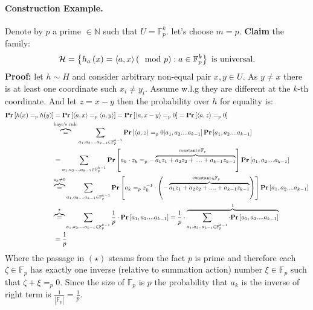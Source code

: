 \paragraph{Construction Example.}
Denote by \(p\) a prime \( \in \mathbb{N}\) such that \(U = \mathbb{F}_{p}^{k}\). let's choose \(m=p\).
\textbf{Claim} the family: \begin{equation*}
    \mathcal{H} = \left\{h_{a}\left(x\right) = \braket{a,x}\left(\mod p\right) : a \in \mathbb{F}_{p}^{k} \right\} \text{  is universal.}
\end{equation*} 
\textbf{Proof:} let \(h \sim H\) and consider arbitrary non-equal pair \(x,y\in U\). As \(y \neq x\) there is at least one coordinate such \(x_i \neq y_i\). Assume w.l.g they are different at the \(k\)-th coordinate. And let \(z = x- y\) then the probability over \(h\) for equality is:  \begin{equation*}
\begin{split}
    \mathbf{Pr} \left[ {h(x) =_{p} h(y)} \right] &= \mathbf{Pr} \left[ {\braket{a,x} =_{p} \braket{a,y}} \right] = \mathbf{Pr} \left[ {\braket{a,x-y} =_{p} 0 } \right]  = \mathbf{Pr} \left[ {\braket{a,z} =_{p} 0 } \right] \\ &  \overset{\text{baye's rule}}{\overbrace{=}} \sum_{a_1,a_2 .... a_{k-1} \in \mathbb{F}_{p}^{k-1}}{ \mathbf{Pr} \left[ { \braket{a,z} =_{p} 0 | a_1,a_2 .... a_{k-1} } \right] \mathbf{Pr} \left[ { a_1,a_2 .... a_{k-1} } \right] } \\ &=    \sum_{a_1,a_2 .... a_{k-1} \in \mathbb{F}_{p}^{k-1}}{ \mathbf{Pr} \left[ { a_k \cdot z_k  =_{p} \overset{\text{constant} \in \mathbb{F}_{p}}{- \overbrace{a_{1}z_{1} +a_{2}z_{2} + ....+ a_{k-1}z_{k-1}}} } \right] \mathbf{Pr} \left[ { a_1,a_2 .... a_{k-1} } \right] } \\ & \overset{z_{k} \neq 0}{\overbrace{=}}     \sum_{a_1,a_2 .... a_{k-1} \in \mathbb{F}_{p}^{k-1}}{ \mathbf{Pr} \left[ { a_k =_{p} z_{k}^{-1} \cdot \left( \overset{\text{constant} \in \mathbb{F}_{p}}{- \overbrace{a_{1}z_{1} +a_{2}z_{2} + ....+ a_{k-1}z_{k-1}}} \right) } \right] \mathbf{Pr} \left[ { a_1,a_2 .... a_{k-1} } \right] }  \\ & \overset{\star}{\overbrace{=}}  \sum_{a_1,a_2 .... a_{k-1} \in \mathbb{F}_{p}^{k-1}}{\frac{1}{p} \cdot  \mathbf{Pr} \left[ { a_1,a_2 .... a_{k-1} } \right] } = \frac{1}{p}\cdot \overset{1}{\overbrace{\sum_{a_1,a_2 .. a_{k-1} \in \mathbb{F}_{p}^{k-1}}{\cdot  \mathbf{Pr} \left[ { a_1,a_2 .... a_{k-1} } \right]} }} \\ & = \frac{1}{p}
\end{split}
\end{equation*}
Where the passage in \((\star)\) steams from the fact \(p\) is prime and therefore  each \(\zeta \in \mathbb{F}_{p}\) has exactly one inverse (relative to summation action) number \(\xi \in \mathbb{F}_{p}\) such that \( \zeta + \xi =_{p} 0 \). Since the size of \( \mathbb{F}_{p}\) is \(p\) the probability that \(a_{k}\) is the inverse of right term is \(\frac{1}{|\mathbb{F}_{p}|} = \frac{1}{p} \). 

